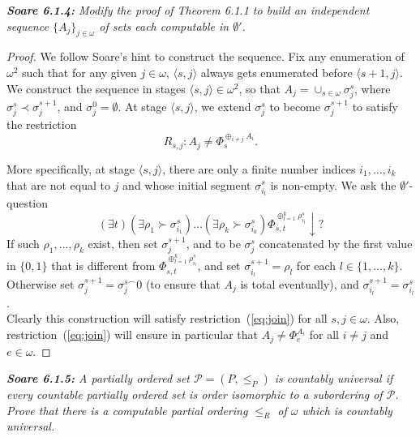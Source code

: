 \documentclass{article}
\begin{document}
\it \textbf{Soare 6.1.4:} Modify the proof of Theorem 6.1.1 to build an
  independent sequence $\{A_j\}_{j\in\omega}$ of sets each computable in
  $\emptyset'$.

  \begin{proof}
    We follow Soare's hint to construct the sequence. Fix any enumeration
    of $\omega^2$ such that for any given $j\in\omega$, $\langle
    s,j\rangle$ always gets enumerated before $\langle s+1,j\rangle$. We
    construct the sequence in stages $\langle s,j\rangle \in\omega^2$, so
    that $A_j=\cup_{s\in\omega} \sigma_{j}^s$, where $\sigma_j^s\prec
    \sigma_j^{s+1}$, and $\sigma_j^0=\emptyset$. At stage $\langle
    s,j\rangle$, we extend $\sigma_j^s$ to become $\sigma_j^{s+1}$ to satisfy
    the restriction
    \begin{equation}
      R_{s,j}: A_j \neq \Phi_s^{\oplus_{i\neq j} A_i}.
      \label{eq:join}
    \end{equation}

    More specifically, at stage $\langle s,j\rangle$, there are only a
    finite number indices $i_1,\ldots,i_k$ that are not equal to $j$ and
    whose initial segment $\sigma_{i_l}^s$ is non-empty. We ask the
    $\emptyset'$-question
    \[(\exists t) (\exists \rho_1 \succ \sigma_{i_1}^s) \ldots (\exists
    \rho_k \succ \sigma_{i_k}^s) \Phi_{s,t}^{\oplus_{l=1}^k
    \rho_{i_l}^s} \downarrow?\]
    If such $\rho_1,\ldots,\rho_k$ exist, then set $\sigma_j^{s+1}$, and to
    be $\sigma_j^s$ concatenated by the first value in $\{0,1\}$ that is
    different from $\Phi_{s,t}^{\oplus_{l=1}^k \rho_{i_l}^s}$, and set
    $\sigma_{i_l}^{s+1}=\rho_l$ for each $l\in\{1,\ldots,k\}$.
    Otherwise set $\sigma_j^{s+1}=\sigma_j^{s\frown}0$ (to ensure that
    $A_j$ is total eventually), and $\sigma_{i_l}^{s+1} =\sigma_{i_l}^{s}$.
    \\

    Clearly this construction will satisfy restriction~(\ref{eq:join})
    for all $s,j\in\omega$. Also, restriction~(\ref{eq:join}) will ensure
    in particular that $A_j\neq \Phi_e^{A_i}$ for all $i\neq j$ and
    $e\in\omega$. 
  \end{proof}

\it \textbf{Soare 6.1.5:} A partially ordered set $\mathcal{P}=(P,\leq_P)$
  is countably universal if every countable partially ordered set is order
  isomorphic to a subordering of $\mathcal{P}$. Prove that there is a
  computable partial ordering $\leq_R$ of $\omega$ which is countably
  universal.
\end{document}
